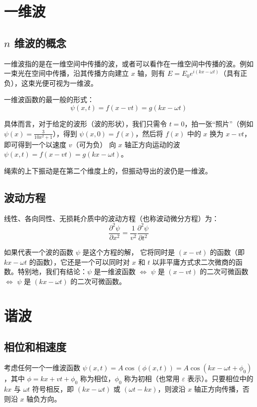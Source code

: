 \documentclass[UTF8]{report}
\theoremstyle{MyLineTheoremStyle} %
\theoremstyle{MyBlockTheoremStyle} %
\theoremstyle{MySubsubsectionStyle} %
\begin{document}
\section{一维波}

\subsection{$n$ 维波的概念}

一维波指的是在一维空间中传播的波，或者可以看作在一维空间中传播的波。例如一束光在空间中传播，沿其传播方向建立 $x$ 轴，则有 $E = E_0 e^{i(kx - \omega t)}$（具有正负），这束光便可视为一维波。

一维波函数的最一般的形式：
\begin{equation}
\psi(x,t) = f(x-vt) = g(kx - \omega t)
\end{equation}

具体而言，对于给定的波形（波的形状），我们只需令 $t=0$，拍一张“照片”（例如 $\psi(x) = \frac{3}{10x^2+1}$），得到 $\psi(x,0) = f(x)$，然后将 $f(x)$ 中的 $x$ 换为 $x-vt$，即可得到一个以速度 $v$（可为负） 向 $x$ 轴正方向运动的波 $\psi(x,t) = f(x - vt) = g(kx - \omega t)$。
{\par\color{gray}\small
绳索的上下振动是在第二个维度上的，但振动导出的波仍是一维波。
\par}


\subsection{波动方程}

线性、各向同性、无损耗介质中的波动方程（也称波动微分方程）为：
\begin{equation}
    \frac{\partial^{2}\psi}{\partial x^{2}}=\frac{1}{v^{2}}\frac{\partial^{2}\psi}{\partial t^{2}} 
\end{equation}

如果代表一个波的函数 $\psi$ 是这个方程的解， 它将同时是 $(x-vt)$ 的函数（即 $kx - \omega t$ 的函数），它还是一个可以同时对 $x$ 和 $t$ 以非平庸方式求二次微商的函数。特别地，我们有结论：$\psi$ 是一维波函数 $\Longleftrightarrow$ $\psi$ 是 $(x-vt)$ 的二次可微函数 $\Longleftrightarrow$ $\psi$ 是 $(kx - \omega t)$ 的二次可微函数。

\section{谐波}

\subsection{相位和相速度}
考虑任何一个一维波函数 $\psi(x,t) = A \cos(\phi(x,t)) = A \cos (kx - \omega t + \phi_0) $，其中 $\phi = kx+vt + \phi_0$ 称为相位，$\phi_0$ 称为初相（也常用 $\varepsilon$ 表示）。只要相位中的 $kx$ 与 $\omega t$ 符号相反，即 $(kx - \omega t)$ 或 $(\omega t - kx)$，则波沿 $x$ 轴正方向传播，否则沿 $x$ 轴负方向。
\end{document}
